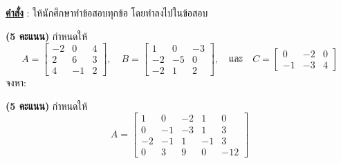 ﻿\documentclass[12pt, a4paper]{exam}
\begin{document}
\sloppy
\setcounter{page}{2}

\noindent \textbf{\underline{คำสั่ง}} : ให้นักศึกษาทำข้อสอบทุกข้อ โดยทำลงไปในข้อสอบ
\vspace{0.5cm}

\begin{questions}

\question \textbf{(5 คะแนน)} กำหนดให้
\[
A = \begin{bmatrix} -2 & 0 & 4 \\ 2 & 6 & 3 \\ 4 & -1 & 2 \end{bmatrix}, \quad
B = \begin{bmatrix} 1 & 0 & -3 \\ -2 & -5 & 0 \\ -2 & 1 & 2 \end{bmatrix}, \quad \text{และ} \quad
C = \begin{bmatrix} 0 & -2 & 0 \\ -1 & -3 & 4 \end{bmatrix}
\]
จงหา:

\newpage

\question \textbf{(5 คะแนน)} กำหนดให้
\[
A = \begin{bmatrix} 
1 & 0 & -2 & 1 & 0 \\ 
0 & -1 & -3 & 1 & 3 \\ 
-2 & -1 & 1 & -1 & 3 \\ 
0 & 3 & 9 & 0 & -12 
\end{bmatrix}
\]
\begin{parts}

\end{parts}
\end{questions}
\end{document}
